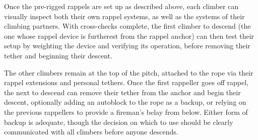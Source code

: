 \documentclass[nonacm,acmtog]{acmart}
\begin{document}
  Once the pre-rigged rappels are set up as described above, each climber can
  visually inspect both their own rappel systems, as well as the systems of
  their climbing partners.  With cross-checks complete, the first climber to
  descend (the one whose rappel device is furtherest from the rappel anchor)
  can then test their setup by weighting the device and verifying its operation,
  before removing their tether and beginning their descent.

  The other climbers remain at the top of the pitch, attached to the rope via
  their rappel extensions and personal tethers.  Once the first rappeller goes
  off rappel, the next to descend can remove their tether from the anchor and
  begin their descent, optionally adding an autoblock to the rope as a backup,
  or relying on the previous rappellers to provide a fireman's belay from
  below.  Either form of backup is adequate, though the decision on which to
  use should be clearly communicated with all climbers before anyone descends.




\end{document}
